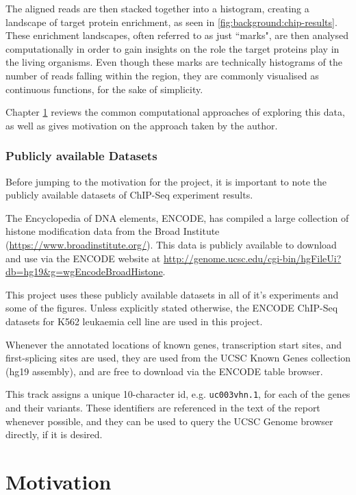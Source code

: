 \documentclass[parskip]{cs4rep}
\newcommand{\gene}[1]{{\tt #1}}
\begin{document}
The aligned reads are then stacked together into a histogram, creating a landscape of target protein enrichment, as seen in \autoref{fig:background:chip-results}. These enrichment landscapes, often referred to as just ``marks", are then analysed computationally in order to gain insights on the role the target proteins play in the living organisms. Even though these marks are technically histograms of the number of reads falling within the region, they are commonly visualised as continuous functions, for the sake of simplicity.

Chapter \ref{cha:motivation} reviews the common computational approaches of exploring this data, as well as gives motivation on the approach taken by the author.

\subsection{Publicly available Datasets}
\label{sec:datasets}

Before jumping to the motivation for the project, it is important to note the publicly available datasets of ChIP-Seq experiment results.

The Encyclopedia of DNA elements, ENCODE, \cite{TheENCODEProjectConsortium:2004db} has compiled a large collection of histone modification data from the Broad Institute (\url{https://www.broadinstitute.org/}). This data is publicly available to download and use via the ENCODE website at \url{http://genome.ucsc.edu/cgi-bin/hgFileUi?db=hg19&g=wgEncodeBroadHistone}. 

This project uses these publicly available datasets in all of it's experiments and some of the figures. Unless explicitly stated otherwise, the ENCODE ChIP-Seq datasets for K562 leukaemia cell line are used in this project.

Whenever the annotated locations of known genes, transcription start sites, and first-splicing sites are used, they are used from the UCSC Known Genes collection \cite{Hsu:2006dh} (hg19 assembly), and are free to download via the ENCODE table browser. 

This track assigns a unique 10-character id, e.g. \gene{uc003vhn.1}, for each of the genes and their variants. These identifiers are referenced in the text of the report whenever possible, and they can be used to query the UCSC Genome browser \cite{Kent:2002wd} directly, if it is desired.

\chapter{Motivation}
\label{cha:motivation}
\end{document}
